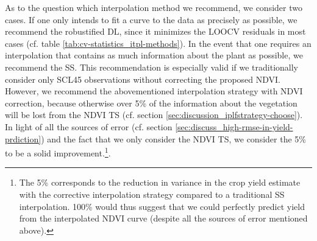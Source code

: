 As to the question which interpolation method we recommend, we consider two cases. If one only intends to fit a curve to the data as precisely as possible, we recommend the robustified DL, since it minimizes the LOOCV residuals in most cases (cf. table \ref{tab:cv-statistics_itpl-methods}). In the event that one requires an interpolation that contains as much information about the plant as possible, we recommend the SS. This recommendation is especially valid if we traditionally consider only SCL45 observations without correcting the proposed NDVI. However, we recommend the abovementioned interpolation strategy with NDVI correction, because otherwise over 5\% of the information about the vegetation will be lost from the NDVI {TS} (cf. section \ref{sec:discussion_iplfstrategy-choose}). In light of all the sources of error (cf. section \ref{sec:discuss_high-rmse-in-yield-prdiction}) and the fact that we only consider the NDVI {TS}, we consider the 5\% to be a solid improvement.\footnote{The 5\% corresponds to the reduction in variance in the crop yield estimate with the corrective interpolation strategy compared to a traditional SS interpolation. 100\% would thus suggest that we could perfectly predict yield from the interpolated NDVI curve (despite all the sources of error mentioned above).}.





